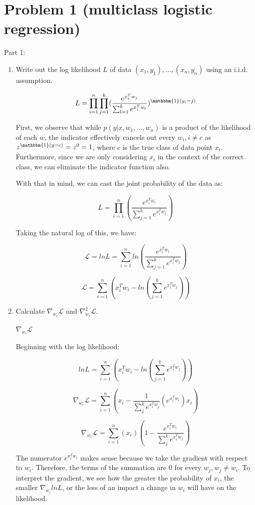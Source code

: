 \documentclass[11pt]{article}
\begin{document}

\section*{Problem 1 (multiclass logistic regression)}

Part 1:
\begin{enumerate}
\item Write out the log likelihood $L$ of data $(x_1, y_1), . . . , (x_n, y_n)$ using an i.i.d. assumption.

\[
L = \prod_{i=1}^{n} \prod_{j=1}^{k} (\frac{e^{x_i^Tw_j}}{\sum_{l=1}^k e^{x_i^Tw_l}})^{\mathbbm{1}(y_i = j)}
\]

First, we observe that while $p(y|x, w_1, ..., w_n)$ is a product of the likelihood of each $w$, the indicator effectively cancels out every $w_i, i \neq c$ as $z^{\mathbbm{1}(y = c)} = z^0 = 1$, where $c$ is the true class of data point $x_i$. Furthermore, since we are only considering $x_i$ in the context of the correct class, we can eliminate the indicator function also.

With that in mind, we can cast the joint probability of the data as:

\[
L = \prod_{i=1}^{n} (\frac{e^{x_i^Tw_i}}{\sum_{j=1}^k e^{x_i^Tw_j}})
\]

Taking the natural log of this, we have:

\[
\mathcal{L} = lnL = \sum_{i=1}^{n} ln(\frac{e^{x_i^Tw_i}}{\sum_{j=1}^k e^{x_i^Tw_j}})
\]

\[
\mathcal{L} = \sum_{i=1}^{n} (x_i^Tw_i - ln({\sum_{j=1}^k e^{x_i^Tw_j}}))
\]

\item Calculate $\nabla_{w_i} \mathcal{L}$ and $\nabla^2_{w_i} \mathcal{L}$.

$\nabla_{w_i} \mathcal{L}$

Beginning with the log likelihood:

\[
lnL = \sum_{i=1}^{n} (x_i^Tw_i - ln({\sum_{j=1}^k e^{x_i^Tw_j}}))
\]

\[
\nabla_{w_i}\mathcal{L} = \sum_{i=1}^{n} (x_i - \frac{1}{\sum_j^k e^{x_i^Tw_j}} (e^{x_i^Tw_i}) x_i)
\]

\[
\nabla_{w_i}\mathcal{L} = \sum_{i=1}^{n}(x_i) (1 - \frac{e^{x_i^Tw_i}}{\sum_j^k e^{x_i^Tw_j}})
\]

The numerator $e^{x_i^Tw_i}$ makes sense because we take the gradient with respect to $w_i$. Therefore, the terms of the summation are 0 for every $w_j, w_j \neq w_i$.
To interpret the gradient, we see how the greater the probability of $x_i$, the smaller $\nabla_{w_i}lnL$, or the less of an impact a change in $w_i$ will have on the likelihood.


\end{enumerate}
\end{document}
